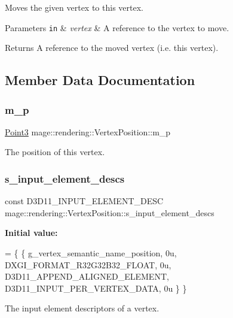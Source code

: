 Moves the given vertex to this vertex.


\begin{DoxyParams}[1]{Parameters}
\mbox{\tt in}  & {\em vertex} & A reference to the vertex to move. \\
\hline
\end{DoxyParams}
\begin{DoxyReturn}{Returns}
A reference to the moved vertex (i.\+e. this vertex). 
\end{DoxyReturn}


\subsection{Member Data Documentation}
\mbox{\label{structmage_1_1rendering_1_1_vertex_position_a49602fa786c64fb0fca47a0a0992f779}} 
\subsubsection{\texorpdfstring{m\+\_\+p}{m\_p}}
{\footnotesize\ttfamily \mbox{\hyperlink{structmage_1_1_point3}{Point3}} mage\+::rendering\+::\+Vertex\+Position\+::m\+\_\+p}

The position of this vertex. \mbox{\label{structmage_1_1rendering_1_1_vertex_position_a094b822673f010526197174900dd4349}} 
\subsubsection{\texorpdfstring{s\+\_\+input\+\_\+element\+\_\+descs}{s\_input\_element\_descs}}
{\footnotesize\ttfamily const D3\+D11\+\_\+\+I\+N\+P\+U\+T\+\_\+\+E\+L\+E\+M\+E\+N\+T\+\_\+\+D\+E\+SC mage\+::rendering\+::\+Vertex\+Position\+::s\+\_\+input\+\_\+element\+\_\+descs\hspace{0.3cm}{\ttfamily [static]}}

{\bfseries Initial value\+:}
\begin{DoxyCode}
= \{
        \{ g\_vertex\_semantic\_name\_position, 0u, DXGI\_FORMAT\_R32G32B32\_FLOAT,    0u, 
      D3D11\_APPEND\_ALIGNED\_ELEMENT, D3D11\_INPUT\_PER\_VERTEX\_DATA, 0u \}
    \}
\end{DoxyCode}
The input element descriptors of a vertex. 